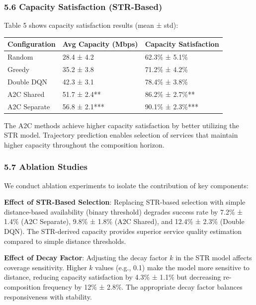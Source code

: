 \hypertarget{capacity-satisfaction-str-based}{%
	\subsubsection{5.6 Capacity Satisfaction
		(STR-Based)}\label{capacity-satisfaction-str-based}}

Table 5 shows capacity satisfaction results (mean ± std):

\begin{longtable}[]{@{}lll@{}}
	\toprule\noalign{}
	Configuration & Avg Capacity (Mbps) & Capacity Satisfaction \\
	\midrule\noalign{}
	\endhead
	\bottomrule\noalign{}
	\endlastfoot
	Random        & 28.4 ± 4.2          & 62.3\% ± 5.1\%        \\
	Greedy        & 35.2 ± 3.8          & 71.2\% ± 4.2\%        \\
	Double DQN    & 42.3 ± 3.1          & 78.4\% ± 3.8\%        \\
	A2C Shared    & 51.7 ± 2.4**        & 86.2\% ± 2.7\%**      \\
	A2C Separate  & 56.8 ± 2.1***       & 90.1\% ± 2.3\%***     \\
\end{longtable}

The A2C methods achieve higher capacity satisfaction by better utilizing
the STR model. Trajectory prediction enables selection of services that
maintain higher capacity throughout the composition horizon.

\hypertarget{ablation-studies}{%
	\subsubsection{5.7 Ablation Studies}\label{ablation-studies}}

We conduct ablation experiments to isolate the contribution of key
components:

\textbf{Effect of STR-Based Selection}: Replacing STR-based selection
with simple distance-based availability (binary threshold) degrades
success rate by 7.2\% ± 1.4\% (A2C Separate), 9.8\% ± 1.8\% (A2C
Shared), and 12.4\% ± 2.3\% (Double DQN). The STR-derived capacity
provides superior service quality estimation compared to simple distance
thresholds.

\textbf{Effect of Decay Factor}: Adjusting the decay factor \(k\) in the
STR model affects coverage sensitivity. Higher \(k\) values (e.g., 0.1)
make the model more sensitive to distance, reducing capacity
satisfaction by 4.3\% ± 1.1\% but decreasing re-composition frequency by
12\% ± 2.8\%. The appropriate decay factor balances responsiveness with
stability.

